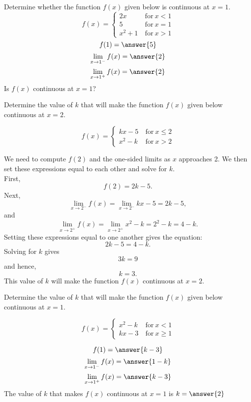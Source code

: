 \documentclass{ximera}
\begin{document}
\begin{problem} %
Determine whether the function $f(x)$ given below is continuous at $x = 1$.
\[
f(x) = \left\{
     \begin{array}{lr}
       2x & \ \text{for} \  x < 1 \\
			 5 & \ \text{for} \  x = 1 \\
       x^2 + 1 & \ \text{for} \ x > 1
     \end{array}
   \right.
\]
\[
f(1) = \answer{5}
\]
\[
\lim_{x \to 1^-} f(x) = \answer{2}
\]
\[
\lim_{x \to 1^+} f(x) = \answer{2}
\]
Is $f(x)$ continuous at $x = 1$?
\begin{multipleChoice}
\end{multipleChoice}
\end{problem}







\begin{example} %
Determine the value of $k$ that will make the function $f(x)$ given below 
continuous at $x = 2$.
 
\[f(x) = \left\{
     \begin{array}{lr}
       kx-5 & \ \text{for} \  x \leq 2 \\
			 x^2 - k & \ \text{for} \ x > 2
     \end{array}
   \right.
\]

We need to  compute $f(2)$ and the one-sided limits as $x$ approaches 2.
We then set these expressions equal to each other and solve for $k$.\\
First,
\[
f(2) = 2k-5.
\]
Next,
\[
\lim_{x \to 2^-} f(x) = \lim_{x \to 2^-} kx-5 = 2k-5,
\]
and
\[
\lim_{x \to 2^+} f(x) = \lim_{x \to 2^+} x^2 - k = 2^2 - k = 4 - k.
\]
Setting these expressions equal to one another gives the equation:
\[2k - 5 = 4 - k.\]
Solving for $k$ gives
\[3k = 9\]
and hence,
\[k = 3.\]
This value of $k$ will make the function $f(x)$ continuous at $x=2$.
\end{example}

\begin{problem}
Determine the value of $k$ that will make the function $f(x)$ given below 
continuous at $x = 1$.
 
\[f(x) = \left\{
     \begin{array}{lr}
        x^2 - k & \ \text{for} \  x < 1 \\
			 kx-3 & \ \text{for} \ x \geq 1
     \end{array}
   \right.
\]

\[
f(1) = \answer{k-3}
\]
\[
\lim_{x \to 1^-} f(x) = \answer{1-k}
\]
\[
\lim_{x \to 1^+} f(x) = \answer{k-3}
\]
The value of $k$ that makes $f(x)$ continuous at $x = 1$ is
$k = \answer{2}$
\end{problem}
\end{document}
